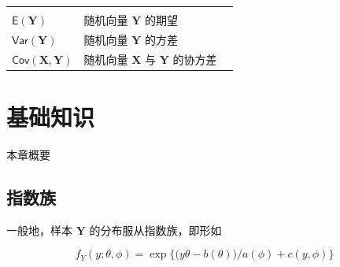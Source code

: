 \documentclass[12pt,a4paper,UTF8,twoside]{book}
\theoremstyle{definition}
\theoremstyle{definition}
\theoremstyle{definition}
\theoremstyle{remark}
\begin{document}
\begin{longtable}[]{@{}llc@{}}
\begin{minipage}[t]{0.14\columnwidth}
\strut
\end{minipage}\tabularnewline
\begin{minipage}[t]{0.15\columnwidth}\raggedright
\(\mathsf{E}(\mathbf{Y})\)\strut
\end{minipage} & \begin{minipage}[t]{0.63\columnwidth}\raggedright
随机向量 \(\mathbf{Y}\) 的期望\strut
\end{minipage} & \begin{minipage}[t]{0.14\columnwidth}\centering
\strut
\end{minipage}\tabularnewline
\begin{minipage}[t]{0.15\columnwidth}\raggedright
\(\mathsf{Var}(\mathbf{Y})\)\strut
\end{minipage} & \begin{minipage}[t]{0.63\columnwidth}\raggedright
随机向量 \(\mathbf{Y}\) 的方差\strut
\end{minipage} & \begin{minipage}[t]{0.14\columnwidth}\centering
\strut
\end{minipage}\tabularnewline
\begin{minipage}[t]{0.15\columnwidth}\raggedright
\(\mathsf{Cov}(\mathbf{X},\mathbf{Y})\)\strut
\end{minipage} & \begin{minipage}[t]{0.63\columnwidth}\raggedright
随机向量 \(\mathbf{X}\) 与 \(\mathbf{Y}\) 的协方差\strut
\end{minipage} & \begin{minipage}[t]{0.14\columnwidth}\centering
\strut
\end{minipage}\tabularnewline
\bottomrule
\end{longtable}

\hypertarget{prepare}{%
\chapter{基础知识}\label{prepare}}

{本章概要}

\hypertarget{sec:exp}{%
\section{指数族}\label{sec:exp}}

一般地，样本 \(\mathbf{Y}\) 的分布服从指数族，即形如

\begin{equation}
f_{Y}(y;\theta,\phi) = \exp\big\{ \big(y\theta - b(\theta) \big)/a(\phi) + c(y,\phi) \big\}
\label{eq:common-exponential-family}
\end{equation}
\end{document}
